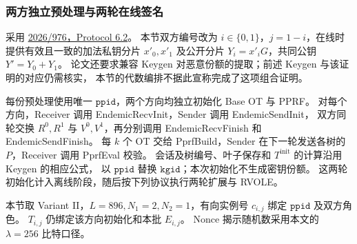 \subsubsection{两方独立预处理与两轮在线签名}

采用 \href{https://eprint.iacr.org/2026/976.pdf}{2026/976，Protocol 6.2}。
本节双方编号改为 $i\in\{0,1\}$，$j=1-i$，在线时提供有效且一致的加法私钥分片
$x'_0,x'_1$ 及公开分片 $Y_i=x'_iG$，共同公钥 $Y'=Y_0+Y_1$。
论文还要求兼容 Keygen 对恶意份额的提取；前述 Keygen 与该证明的对应仍需核实，
本节的代数编排不据此宣称完成了这项组合证明。

每份预处理使用唯一 $\mathtt{ppid}$，两个方向均独立初始化 Base OT 与 PPRF。
对每个方向，Receiver 调用 EndemicRecvInit，Sender 调用 EndemicSendInit，
双方同轮交换 $R^0,R^1$ 与 $V^0,V^1$，再分别调用 EndemicRecvFinish 和 EndemicSendFinish。
每 $k$ 个 OT 交给 PprfBuild，Sender 在下一轮发送各树的 $P$，Receiver 调用 PprfEval 校验。
会话及树编号、叶子保存和 $T^{\mathrm{init}}$ 的计算沿用 Keygen 的相应公式，
以 $\mathtt{ppid}$ 替换 $\mathtt{kgid}$；本次初始化不生成密钥份额。
这两轮初始化计入离线阶段，随后按下列协议执行两轮扩展与 RVOLE。

本节取 Variant II，$L=896,N_1=2,N_2=1$，有向实例号 $c_{i,j}$ 绑定 $\mathtt{ppid}$ 及双方角色。
$T_{i,j}$ 仍绑定该方向初始化和本批 $E_{i,j}$。
Nonce 揭示随机数采用本文的 $\lambda=256$ 比特口径。

